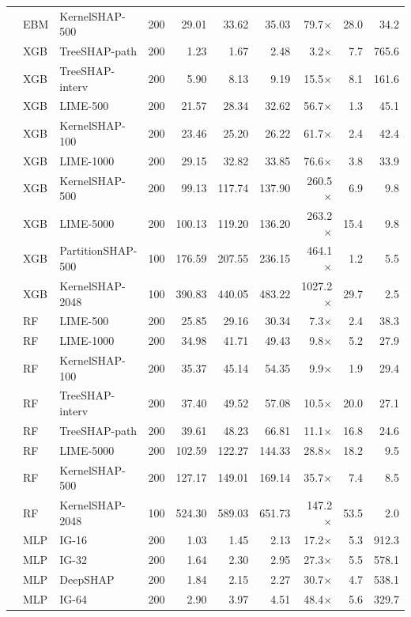 \begin{longtable}{lllrrrrrrr}
 & EBM & KernelSHAP-500 & 200 & 29.01 & 33.62 & 35.03 & 79.7$\times$ & 28.0 & 34.2 \\
 & XGB & TreeSHAP-path & 200 & 1.23 & 1.67 & 2.48 & 3.2$\times$ & 7.7 & 765.6 \\
 & XGB & TreeSHAP-interv & 200 & 5.90 & 8.13 & 9.19 & 15.5$\times$ & 8.1 & 161.6 \\
 & XGB & LIME-500 & 200 & 21.57 & 28.34 & 32.62 & 56.7$\times$ & 1.3 & 45.1 \\
 & XGB & KernelSHAP-100 & 200 & 23.46 & 25.20 & 26.22 & 61.7$\times$ & 2.4 & 42.4 \\
 & XGB & LIME-1000 & 200 & 29.15 & 32.82 & 33.85 & 76.6$\times$ & 3.8 & 33.9 \\
 & XGB & KernelSHAP-500 & 200 & 99.13 & 117.74 & 137.90 & 260.5$\times$ & 6.9 & 9.8 \\
 & XGB & LIME-5000 & 200 & 100.13 & 119.20 & 136.20 & 263.2$\times$ & 15.4 & 9.8 \\
 & XGB & PartitionSHAP-500 & 100 & 176.59 & 207.55 & 236.15 & 464.1$\times$ & 1.2 & 5.5 \\
 & XGB & KernelSHAP-2048 & 100 & 390.83 & 440.05 & 483.22 & 1027.2$\times$ & 29.7 & 2.5 \\
 & RF & LIME-500 & 200 & 25.85 & 29.16 & 30.34 & 7.3$\times$ & 2.4 & 38.3 \\
 & RF & LIME-1000 & 200 & 34.98 & 41.71 & 49.43 & 9.8$\times$ & 5.2 & 27.9 \\
 & RF & KernelSHAP-100 & 200 & 35.37 & 45.14 & 54.35 & 9.9$\times$ & 1.9 & 29.4 \\
 & RF & TreeSHAP-interv & 200 & 37.40 & 49.52 & 57.08 & 10.5$\times$ & 20.0 & 27.1 \\
 & RF & TreeSHAP-path & 200 & 39.61 & 48.23 & 66.81 & 11.1$\times$ & 16.8 & 24.6 \\
 & RF & LIME-5000 & 200 & 102.59 & 122.27 & 144.33 & 28.8$\times$ & 18.2 & 9.5 \\
 & RF & KernelSHAP-500 & 200 & 127.17 & 149.01 & 169.14 & 35.7$\times$ & 7.4 & 8.5 \\
 & RF & KernelSHAP-2048 & 100 & 524.30 & 589.03 & 651.73 & 147.2$\times$ & 53.5 & 2.0 \\
 & MLP & IG-16 & 200 & 1.03 & 1.45 & 2.13 & 17.2$\times$ & 5.3 & 912.3 \\
 & MLP & IG-32 & 200 & 1.64 & 2.30 & 2.95 & 27.3$\times$ & 5.5 & 578.1 \\
 & MLP & DeepSHAP & 200 & 1.84 & 2.15 & 2.27 & 30.7$\times$ & 4.7 & 538.1 \\
 & MLP & IG-64 & 200 & 2.90 & 3.97 & 4.51 & 48.4$\times$ & 5.6 & 329.7 \\

\end{longtable}
